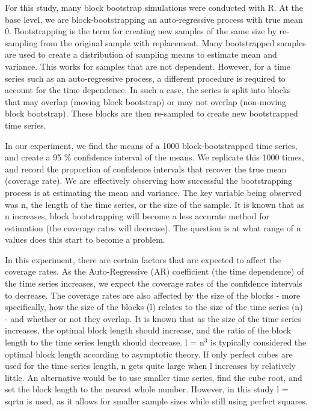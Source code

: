 \documentclass[12pt, letterpaper, titlepage]{article}
\begin{document}
For this study, many block bootstrap simulations were conducted with R. At the base
level, we are block-bootstrapping an auto-regressive process with true mean 0.
Bootstrapping is the term for creating new samples of the same size by re-sampling from
the original sample with replacement. Many bootstrapped samples are used to create a
distribution of sampling means to estimate mean and variance. This works for samples
that are not dependent. However, for a time series such as an auto-regressive process,
a different procedure is required to account for the time dependence. In such a case,
the series is split into blocks that may overlap (moving block bootstrap) or may not
overlap (non-moving block bootstrap). These blocks are then re-sampled to create new
bootstrapped time series. 

In our experiment, we find the means of a 1000 block-bootstrapped time series, 
and create a 95 \% confidence interval of the means. We replicate this 1000 times, 
and record the proportion of confidence intervals that recover the true mean 
(coverage rate). We are effectively observing how successful the bootstrapping process
is at estimating the mean and variance. The key variable being observed was n, 
the length of the time series, or the size of the sample. It is known that as n
increases, block bootstrapping will become a less accurate method for estimation
(the coverage rates will decrease). The question is at what range of n values does this
start to become a problem. 

In this experiment, there are certain factors that are expected to affect the coverage
rates. As the Auto-Regressive (AR) coefficient (the time dependence) of the time series 
increases,
we expect the coverage rates of the confidence intervals to decrease.
The coverage rates are also affected by the size of the blocks - more specifically,
how the size of the blocks (l) relates to the size of the time series (n) - 
and whether or not they overlap. It is known that as the size of the time series 
increases, the optimal block length should increase, and the ratio of the block length to 
the time series length should decrease. l = n$^3$ is typically considered the optimal 
block length according to asymptotic theory. \citep{buhlmann1999block} If only perfect cubes are used for the time 
series length, n gets quite large when l increases by relatively little. An alternative 
would be to use smaller time series, find the cube root, and set the block length to the 
nearest whole number. However, in this study l = sqrt{n} is used, as it allows for smaller 
sample sizes while still using perfect squares.
\end{document}
